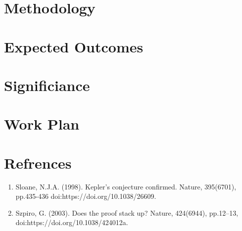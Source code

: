 \documentclass{article}
\begin{document}
\section{Methodology}

\section{Expected Outcomes}
\section{Significiance}
\section{Work Plan}
\pagebreak
\section{Refrences}
\begin{enumerate}
    \item Sloane, N.J.A. (1998). Kepler's conjecture confirmed. Nature, 395(6701), pp.435-436 doi:https://doi.org/10.1038/26609.
    \item Szpiro, G. (2003). Does the proof stack up? Nature, 424(6944), pp.12–13,  doi:https://doi.org/10.1038/424012a.


\end{enumerate} 
\end{document}
